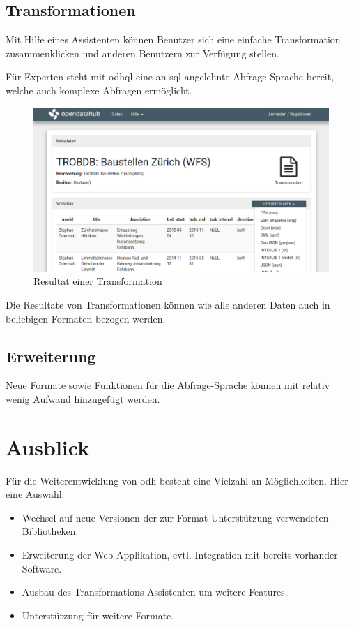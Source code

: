 \subsection*{Transformationen}
Mit Hilfe eines Assistenten können Benutzer sich eine einfache Transformation zusammenklicken und anderen Benutzern zur Verfügung stellen. 

Für Experten steht mit \gls{odhql} eine an \acs{sql} angelehnte Abfrage-Sprache bereit, welche auch komplexe Abfragen ermöglicht.

\begin{figure}[H]
    \centering
    \includegraphics[width=2\linewidth/3]{fig/transformation-detail}
    \caption*{Resultat einer Transformation}
\end{figure}

Die Resultate von Transformationen können wie alle anderen Daten auch in beliebigen Formaten bezogen werden.

\subsection*{Erweiterung}
Neue Formate sowie Funktionen für die Abfrage-Sprache können mit relativ wenig Aufwand hinzugefügt werden.

\section*{Ausblick}
Für die Weiterentwicklung von \acs{odh} besteht eine Vielzahl an Möglichkeiten. Hier eine Auswahl:
\begin{itemize}
\item Wechsel auf neue Versionen der zur Format-Unterstützung verwendeten Bibliotheken.
\item Erweiterung der Web-Applikation, evtl. Integration mit bereits vorhander Software.
\item Ausbau des Transformations-Assistenten um weitere Features.
\item Unterstützung für weitere Formate.
\end{itemize}
